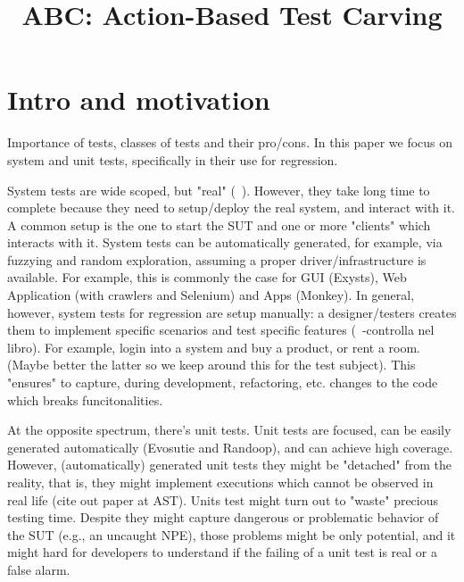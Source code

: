 \documentclass[10pt,conference]{IEEEtran}
\title{ABC: Action-Based Test Carving}
\author{\IEEEauthorblockN{Alessio Gambi}
\IEEEauthorblockA{\textit{University of Passau} \\
Passau, Germany \\
alessio.gambi@uni-passau.de}%
}
\begin{document}
\maketitle

\begin{abstract}
\end{abstract}

\section{Intro and motivation}
Importance of tests, classes of tests and their pro/cons.
In this paper we focus on system and unit tests, specifically in their use for regression.

System tests are wide scoped, but "real" (~\cite{exysts}).
However, they take long time to complete because they need to setup/deploy the real system, and interact with it.
A common setup is the one to start the SUT and one or more "clients" which interacts with it.
System tests can be automatically generated, for example, via fuzzying and random exploration, assuming a proper driver/infrastructure is available.
For example, this is commonly the case for GUI (Exysts),  Web Application (with crawlers and Selenium) and Apps (Monkey).
%
In general, however, system tests for regression are setup manually: a designer/testers creates them to implement 
specific scenarios and test specific features (~\cite{TDD}-controlla nel libro).
%
For example, login into a system and buy a product, or rent a room. (Maybe better the latter so we keep around this for the test subject). 
%
This "ensures" to capture, during development, refactoring, etc. changes to the code which breaks funcitonalities. 

At the opposite spectrum, there's unit tests. Unit tests are focused, can be easily generated automatically (Evosutie and Randoop), and can achieve high coverage. However, (automatically) generated unit tests they might be "detached" from the reality, that is, they might implement executions which cannot be observed in real life (cite out paper at AST). Units test might turn out to  "waste" precious testing time.
Despite they might capture dangerous or problematic behavior of the SUT (e.g., an uncaught NPE), those problems might be only potential, and it might hard for developers to understand if the failing of a unit test is real or a false alarm.
\end{document}
